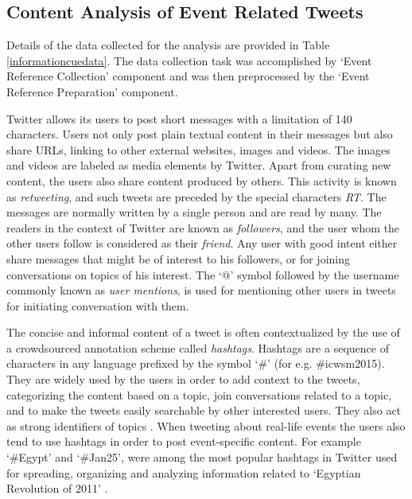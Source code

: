 \subsection{Content Analysis of Event Related Tweets}
Details of the data collected for the analysis are provided in Table \ref{informationcuedata}. The data collection task was accomplished by `Event Reference Collection' component and was then preprocessed by the `Event Reference Preparation' component.

Twitter allows its users to post short messages with a limitation of 140 characters. Users not only post plain textual content in their messages but also share URLs, linking to other external websites, images and videos. The images and videos are 
labeled as media elements by Twitter. Apart from curating new content, the users also share content produced by others. This activity is known as \textit{retweeting}, and such tweets are preceded by the special characters \textit{RT}.
The messages are normally written by a single person and are read by many. The readers in the context of Twitter are known as \textit{followers}, and the user whom the other users follow is considered as their \textit{friend}. Any user with good intent either share messages 
that might be of interest to his followers, or for joining conversations on topics of his interest. The `@' symbol followed by the username commonly known as \textit{user mentions}, is used for mentioning other users in tweets for initiating conversation with them. 

The concise and informal content of a tweet is often contextualized by the use of a crowdsourced annotation scheme called \textit{hashtags}. Hashtags are a sequence of characters in any language prefixed by the symbol `\#' (for e.g. \#icwsm2015). They are widely used
by the users in order to add context to the tweets, categorizing the content based on a topic, join conversations related to a topic, and to make the tweets easily searchable by other interested users. They also act as strong identifiers of topics \cite{laniado2010making}. When tweeting about real-life
events the users also tend to use hashtags in order to post event-specific content. For example `\#Egypt' and `\#Jan25', were among the most popular hashtags in Twitter used for spreading, organizing and analyzing information related to `Egyptian Revolution of 2011' \cite{barrons2012suleiman}. 

